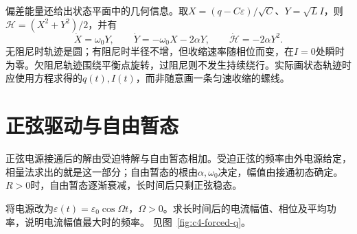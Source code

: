 偏差能量还给出状态平面中的几何信息。取$X=(q-C\varepsilon)/\sqrt C$、$Y=\sqrt L I$，则$\mathcal H=(X^2+Y^2)/2$，并有
\[
 \dot X=\omega_0Y,\qquad \dot Y=-\omega_0X-2\alpha Y,
 \qquad\dot{\mathcal H}=-2\alpha Y^2.
\]
无阻尼时轨迹是圆；有阻尼时半径不增，但收缩速率随相位而变，在$I=0$处瞬时为零。欠阻尼轨迹围绕平衡点旋转，过阻尼则不发生持续绕行。实际画状态轨迹时应使用方程求得的$q(t),I(t)$，而非随意画一条匀速收缩的螺线。


\section{正弦驱动与自由暂态}
正弦电源接通后的解由受迫特解与自由暂态相加。受迫正弦的频率由外电源给定，相量法求出的就是这一部分；自由暂态的根由$\alpha,\omega_0$决定，幅值由接通初态确定。$R>0$时，自由暂态逐渐衰减，长时间后只剩正弦稳态。

\begin{example}[串联RLC的稳态正弦响应]\label{ex:c4-forced}
将电源改为$\varepsilon(t)=\varepsilon_0\cos\Omega t$，$\Omega>0$。求长时间后的电流幅值、相位及平均功率，说明电流幅值最大时的频率。 见图~\ref{fig:c4-forced-q}。
\end{example}

